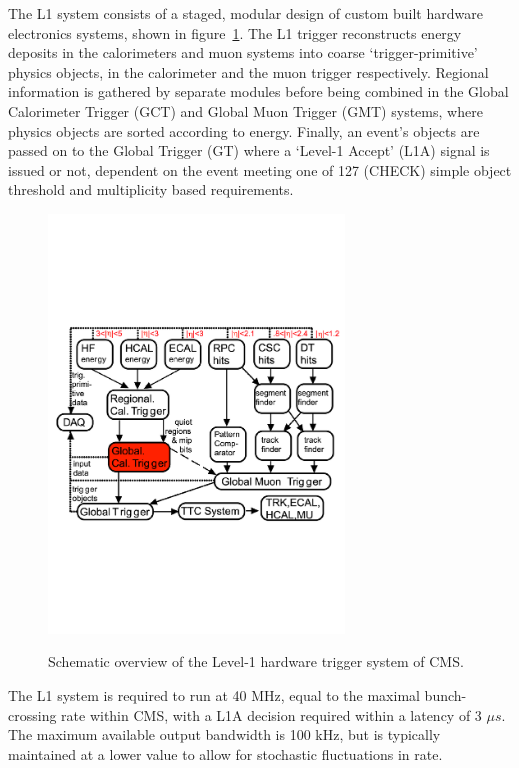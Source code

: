The L1 system consists of a staged, modular design of custom built hardware 
electronics systems, shown in figure~\ref{fig:l1_diagram}. 
The L1 trigger reconstructs energy deposits in the calorimeters and muon systems
into coarse `trigger-primitive' physics objects, in the calorimeter and the muon 
trigger respectively. Regional information is gathered by separate modules 
before being combined in the Global Calorimeter Trigger (GCT) and Global Muon 
Trigger (GMT) systems, where physics objects are sorted according to energy. 
Finally, an event's objects are passed on to the Global Trigger (GT) where a 
`Level-1 Accept' (L1A) signal is issued or not, dependent on the event meeting 
one of 127 (CHECK) simple object threshold and multiplicity based requirements.

\begin{figure}[ht!]
  \centering
  \includegraphics[width = 0.7\textwidth]{Figs/trigger/L1_diagram.pdf}
  \label{fig:l1_diagram}
  \caption{Schematic overview of the Level-1 hardware trigger system of CMS.}
\end{figure}

The L1 system is required to run at 40 MHz, equal to the maximal bunch-crossing
rate within CMS, with a L1A decision required within a latency of 3 $\mu s$. The
maximum available output bandwidth is 100 kHz, but is typically maintained at a 
lower value to allow for stochastic fluctuations in rate.

